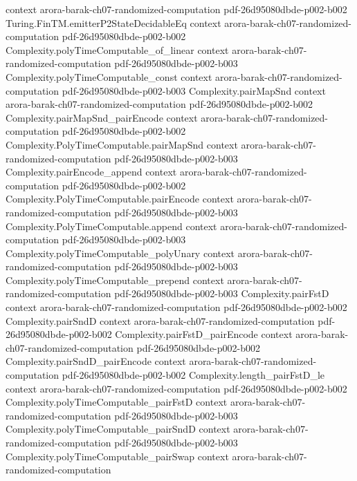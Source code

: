 \begin{theorem}
  {context}
  {arora-barak-ch07-randomized-computation}
  {pdf-26d95080dbde-p002-b002}
\proofstep
  {Turing.FinTM.emitterP2StateDecidableEq}
  {context}
  {arora-barak-ch07-randomized-computation}
  {pdf-26d95080dbde-p002-b002}
\proofstep
  {Complexity.polyTimeComputable_of_linear}
  {context}
  {arora-barak-ch07-randomized-computation}
  {pdf-26d95080dbde-p002-b003}
\proofstep
  {Complexity.polyTimeComputable_const}
  {context}
  {arora-barak-ch07-randomized-computation}
  {pdf-26d95080dbde-p002-b003}
\proofstep
  {Complexity.pairMapSnd}
  {context}
  {arora-barak-ch07-randomized-computation}
  {pdf-26d95080dbde-p002-b002}
\proofstep
  {Complexity.pairMapSnd_pairEncode}
  {context}
  {arora-barak-ch07-randomized-computation}
  {pdf-26d95080dbde-p002-b002}
\proofstep
  {Complexity.PolyTimeComputable.pairMapSnd}
  {context}
  {arora-barak-ch07-randomized-computation}
  {pdf-26d95080dbde-p002-b003}
\proofstep
  {Complexity.pairEncode_append}
  {context}
  {arora-barak-ch07-randomized-computation}
  {pdf-26d95080dbde-p002-b002}
\proofstep
  {Complexity.PolyTimeComputable.pairEncode}
  {context}
  {arora-barak-ch07-randomized-computation}
  {pdf-26d95080dbde-p002-b003}
\proofstep
  {Complexity.PolyTimeComputable.append}
  {context}
  {arora-barak-ch07-randomized-computation}
  {pdf-26d95080dbde-p002-b003}
\proofstep
  {Complexity.polyTimeComputable_polyUnary}
  {context}
  {arora-barak-ch07-randomized-computation}
  {pdf-26d95080dbde-p002-b003}
\proofstep
  {Complexity.polyTimeComputable_prepend}
  {context}
  {arora-barak-ch07-randomized-computation}
  {pdf-26d95080dbde-p002-b003}
\proofstep
  {Complexity.pairFstD}
  {context}
  {arora-barak-ch07-randomized-computation}
  {pdf-26d95080dbde-p002-b002}
\proofstep
  {Complexity.pairSndD}
  {context}
  {arora-barak-ch07-randomized-computation}
  {pdf-26d95080dbde-p002-b002}
\proofstep
  {Complexity.pairFstD_pairEncode}
  {context}
  {arora-barak-ch07-randomized-computation}
  {pdf-26d95080dbde-p002-b002}
\proofstep
  {Complexity.pairSndD_pairEncode}
  {context}
  {arora-barak-ch07-randomized-computation}
  {pdf-26d95080dbde-p002-b002}
\proofstep
  {Complexity.length_pairFstD_le}
  {context}
  {arora-barak-ch07-randomized-computation}
  {pdf-26d95080dbde-p002-b002}
\proofstep
  {Complexity.polyTimeComputable_pairFstD}
  {context}
  {arora-barak-ch07-randomized-computation}
  {pdf-26d95080dbde-p002-b003}
\proofstep
  {Complexity.polyTimeComputable_pairSndD}
  {context}
  {arora-barak-ch07-randomized-computation}
  {pdf-26d95080dbde-p002-b003}
\proofstep
  {Complexity.polyTimeComputable_pairSwap}
  {context}
  {arora-barak-ch07-randomized-computation}

\end{theorem}
